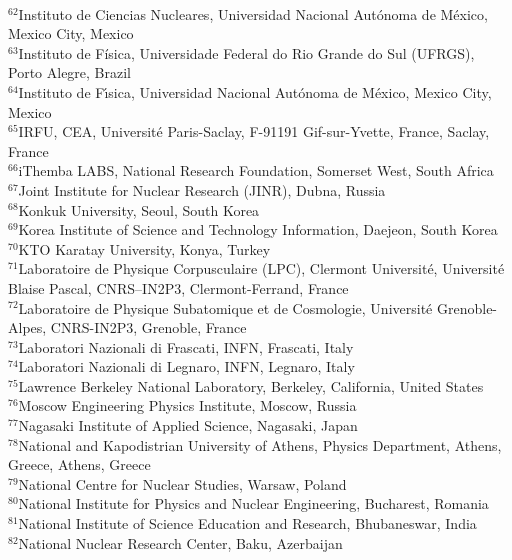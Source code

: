 \begin{flushleft}
\\
$^{62}$Instituto de Ciencias Nucleares, Universidad Nacional Aut\'{o}noma de M\'{e}xico, Mexico City, Mexico
\\
$^{63}$Instituto de F\'{i}sica, Universidade Federal do Rio Grande do Sul (UFRGS), Porto Alegre, Brazil
\\
$^{64}$Instituto de F\'{\i}sica, Universidad Nacional Aut\'{o}noma de M\'{e}xico, Mexico City, Mexico
\\
$^{65}$IRFU, CEA, Universit\'{e} Paris-Saclay, F-91191 Gif-sur-Yvette, France, Saclay, France
\\
$^{66}$iThemba LABS, National Research Foundation, Somerset West, South Africa
\\
$^{67}$Joint Institute for Nuclear Research (JINR), Dubna, Russia
\\
$^{68}$Konkuk University, Seoul, South Korea
\\
$^{69}$Korea Institute of Science and Technology Information, Daejeon, South Korea
\\
$^{70}$KTO Karatay University, Konya, Turkey
\\
$^{71}$Laboratoire de Physique Corpusculaire (LPC), Clermont Universit\'{e}, Universit\'{e} Blaise Pascal, CNRS--IN2P3, Clermont-Ferrand, France
\\
$^{72}$Laboratoire de Physique Subatomique et de Cosmologie, Universit\'{e} Grenoble-Alpes, CNRS-IN2P3, Grenoble, France
\\
$^{73}$Laboratori Nazionali di Frascati, INFN, Frascati, Italy
\\
$^{74}$Laboratori Nazionali di Legnaro, INFN, Legnaro, Italy
\\
$^{75}$Lawrence Berkeley National Laboratory, Berkeley, California, United States
\\
$^{76}$Moscow Engineering Physics Institute, Moscow, Russia
\\
$^{77}$Nagasaki Institute of Applied Science, Nagasaki, Japan
\\
$^{78}$National and Kapodistrian University of Athens, Physics Department, Athens, Greece, Athens, Greece
\\
$^{79}$National Centre for Nuclear Studies, Warsaw, Poland
\\
$^{80}$National Institute for Physics and Nuclear Engineering, Bucharest, Romania
\\
$^{81}$National Institute of Science Education and Research, Bhubaneswar, India
\\
$^{82}$National Nuclear Research Center, Baku, Azerbaijan

\end{flushleft}
